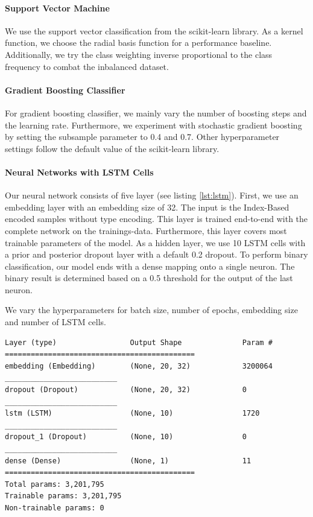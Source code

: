 \paragraph{Support Vector Machine}
We use the support vector classification from the scikit-learn library. As a kernel function, we choose the radial basis function for a performance baseline. Additionally, we try the class weighting inverse proportional to the class frequency to combat the inbalanced dataset.
\paragraph{Gradient Boosting Classifier}
For gradient boosting classifier, we mainly vary the number of boosting steps and the learning rate. Furthermore, we experiment with stochastic gradient boosting by setting the subsample parameter to 0.4 and 0.7. Other hyperparameter settings follow the default value of the scikit-learn library.
\paragraph{Neural Networks with LSTM Cells}
Our neural network consists of five layer (see listing \ref{lst:lstm}). First, we use an embedding layer with an embedding size of 32. The input is the Index-Based encoded samples without type encoding. This layer is trained end-to-end with the complete network on the trainings-data. Furthermore, this layer covers most trainable parameters of the model. As a hidden layer, we use 10 LSTM cells with a prior and posterior dropout layer with a default 0.2 dropout. To perform binary classification, our model ends with a dense mapping onto a single neuron. The binary result is determined based on a 0.5 threshold for the output of the last neuron.

We vary the hyperparameters for batch size, number of epochs, embedding size and number of LSTM cells.

\begin{lstlisting}[label=lst:lstm, caption={Summary of our LSTM network. We use an embedding layer of size 32, 10 LSTM cells, a dropout layer before and after the LSTM layer with a defaut dropout ratio of 0.2 and a dense mapping to a single output neuron for binary classifcation with a threshold of 0.5.}]
Layer (type)                 Output Shape              Param #
============================================
embedding (Embedding)        (None, 20, 32)            3200064
__________________________
dropout (Dropout)            (None, 20, 32)            0
__________________________
lstm (LSTM)                  (None, 10)                1720
__________________________
dropout_1 (Dropout)          (None, 10)                0
__________________________
dense (Dense)                (None, 1)                 11
============================================
Total params: 3,201,795
Trainable params: 3,201,795
Non-trainable params: 0\end{lstlisting}